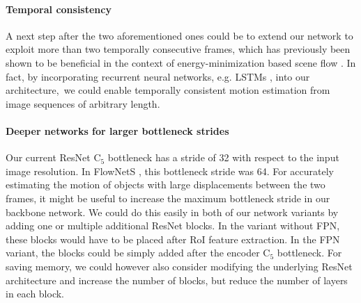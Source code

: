 \paragraph{Temporal consistency}
A next step after the two aforementioned ones could be to extend our network to exploit more than two
temporally consecutive frames, which has previously been shown to be beneficial in the
context of energy-minimization based scene flow \cite{TemporalSF}.
In fact, by incorporating recurrent neural networks, e.g. LSTMs \cite{LSTM},
into our architecture, we could enable temporally consistent motion estimation
from image sequences of arbitrary length.

\paragraph{Deeper networks for larger bottleneck strides}
Our current ResNet C$_5$ bottleneck has a stride of 32 with respect to the
input image resolution. In FlowNetS \cite{FlowNet}, this bottleneck stride was 64.
For accurately estimating the motion of objects with large displacements between
the two frames, it might be useful to increase the maximum bottleneck stride in our backbone network.
We could do this easily in both of our network variants by adding one or multiple additional
ResNet blocks. In the variant without FPN, these blocks would have to be placed
after RoI feature extraction. In the FPN variant, the blocks could be simply
added after the encoder C$_5$ bottleneck.
For saving memory, we could however also consider modifying the underlying
ResNet architecture and increase the number of blocks, but reduce the number
of layers in each block.

